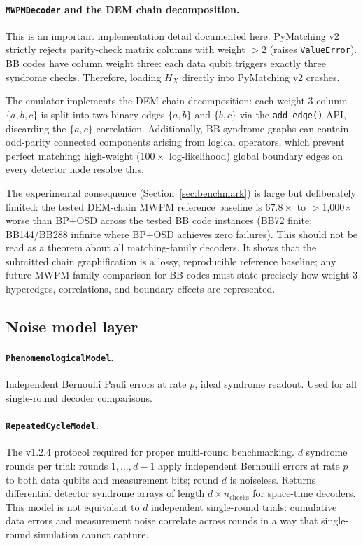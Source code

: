 \documentclass[11pt,a4paper]{article}
\begin{document}
\paragraph{\texttt{MWPMDecoder} and the DEM chain decomposition.}
This is an important implementation detail documented here.
PyMatching v2~\cite{Higgott2023} strictly rejects parity-check matrix
columns with weight $>2$ (raises \texttt{ValueError}).
BB codes have column weight three: each data qubit triggers exactly
three syndrome checks.
Therefore, loading $H_X$ directly into PyMatching v2 crashes.

The emulator implements the DEM chain decomposition: each weight-3
column $\{a,b,c\}$ is split into two binary edges $\{a,b\}$ and
$\{b,c\}$ via the \texttt{add\_edge()} API, discarding the $\{a,c\}$
correlation.
Additionally, BB syndrome graphs can contain odd-parity connected
components arising from logical operators, which prevent perfect
matching; high-weight ($100\times$ log-likelihood) global boundary
edges on every detector node resolve this.

The experimental consequence (Section~\ref{sec:benchmark}) is large but deliberately
limited: the tested DEM-chain MWPM reference baseline is $67.8\times$ to
$>$1{,}000$\times$ worse than BP+OSD across the tested BB code instances
(BB72 finite; BB144/BB288 infinite where BP+OSD achieves zero failures).
This should not be read as a theorem about all matching-family decoders.
It shows that the submitted chain graphification is a lossy, reproducible
reference baseline; any future MWPM-family comparison for BB codes must
state precisely how weight-3 hyperedges, correlations, and boundary effects
are represented.

\subsection{Noise model layer}

\paragraph{\texttt{PhenomenologicalModel}.}
Independent Bernoulli Pauli errors at rate $p$, ideal syndrome readout.
Used for all single-round decoder comparisons.

\paragraph{\texttt{RepeatedCycleModel}.}
The v1.2.4 protocol required for proper multi-round benchmarking.
$d$ syndrome rounds per trial: rounds $1,\ldots,d-1$ apply independent
Bernoulli errors at rate $p$ to both data qubits and measurement bits;
round $d$ is noiseless.
Returns differential detector syndrome arrays of length
$d\times n_{\mathrm{checks}}$ for space-time decoders.
This model is not equivalent to $d$ independent single-round trials:
cumulative data errors and measurement noise correlate across rounds
in a way that single-round simulation cannot capture.
\end{document}
